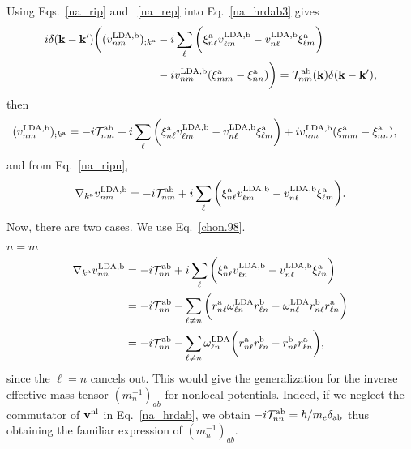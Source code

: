 Using Eqs.~\eqref{na_rip} and ~\eqref{na_rep}
into Eq.~\eqref{na_hrdab3} gives
\begin{align}\label{na_rapb}
i\delta(\mathbf{k}-\mathbf{k}')
\bigg(
(v^{\mathrm{LDA},\mathrm{b}}_{nm})_{;k^{\mathrm{a}}}
&
-i
\sum_{\ell}
\bigg(
\xi^{\mathrm{a}}_{n\ell}
v^{\mathrm{LDA},\mathrm{b}}_{\ell m}
-
v^{\mathrm{LDA},\mathrm{b}}_{n\ell}
\xi^{\mathrm{a}}_{\ell m}
\bigg)
\nonumber \\
&
-i
v^{\mathrm{LDA},\mathrm{b}}_{nm}(\xi^{\mathrm{a}}_{mm}
-
\xi^{\mathrm{a}}_{nn}
)
\bigg)
=
{\cal T}^{\mathrm{a}\mathrm{b}}_{nm}(\mathbf{k})\delta(\mathbf{k}-\mathbf{k}')
,
\end{align}
then
\begin{align}\label{na_rapb2}
(v^{\mathrm{LDA},\mathrm{b}}_{nm})_{;k^{\mathrm{a}}}&=
-i
{\cal T}^{\mathrm{a}\mathrm{b}}_{nm}
+i
\sum_{\ell}
\bigg(
\xi^{\mathrm{a}}_{n\ell}
v^{\mathrm{LDA},\mathrm{b}}_{\ell m}
-
v^{\mathrm{LDA},\mathrm{b}}_{n\ell}
\xi^{\mathrm{a}}_{\ell m}
\bigg)
+i
v^{\mathrm{LDA},\mathrm{b}}_{nm}(\xi^{\mathrm{a}}_{mm}
-
\xi^{\mathrm{a}}_{nn}
)
,
\end{align}
and from Eq.~\eqref{na_ripn},
\begin{align}\label{ncogno}
\nabla_{k^{\mathrm{a}}}v^{\mathrm{LDA},\mathrm{b}}_{nm}=
-i{\cal T}^{\mathrm{a}\mathrm{b}}_{nm}
+i
\sum_{\ell}
\bigg(
\xi^{\mathrm{a}}_{n\ell}
v^{\mathrm{LDA},\mathrm{b}}_{\ell m}
-
v^{\mathrm{LDA},\mathrm{b}}_{n\ell}
\xi^{\mathrm{a}}_{\ell m}
\bigg)
.
\end{align}
Now, there are two cases. We use Eq.~\eqref{chon.98}.

 $n=m$
\begin{align}\label{ntita}
\nabla_{k^{\mathrm{a}}}v^{\mathrm{LDA},\mathrm{b}}_{nn}&=
-i{\cal T}^{\mathrm{a}\mathrm{b}}_{nn}
+i
\sum_{\ell}
\bigg(
\xi^{\mathrm{a}}_{n\ell}
v^{\mathrm{LDA},\mathrm{b}}_{\ell n}
-
v^{\mathrm{LDA},\mathrm{b}}_{n\ell}
\xi^{\mathrm{a}}_{\ell n}
\bigg)
\nonumber\\
&=
-i{\cal T}^{\mathrm{a}\mathrm{b}}_{nn}
-
\sum_{\ell\ne n}
\bigg(
r^{\mathrm{a}}_{n\ell}
\omega^{\mathrm{LDA}}_{\ell n}
r^{\mathrm{b}}_{\ell n}
-
\omega^{\mathrm{LDA}}_{n\ell}
r^{\mathrm{b}}_{n\ell}
r^{\mathrm{a}}_{\ell n}
\bigg)
\nonumber\\
&=
-i{\cal T}^{\mathrm{a}\mathrm{b}}_{nn}
-
\sum_{\ell\ne n}
\omega^{\mathrm{LDA}}_{\ell n}
\bigg(
r^{\mathrm{a}}_{n\ell}
r^{\mathrm{b}}_{\ell n}
-
r^{\mathrm{b}}_{n\ell}
r^{\mathrm{a}}_{\ell n}
\bigg)
,
\end{align}
since the $\ell=n$ cancels out. 
This
would give the generalization for the inverse effective mass
tensor $(m_n^{-1})_{ab}$ for nonlocal potentials.
Indeed, if we neglect the commutator of $\mathbf{v}^{\mathrm{nl}}$ in
Eq.~\eqref{na_hrdab}, we obtain 
$-i{\cal T}^{\mathrm{a}\mathrm{b}}_{nn}=\hbar/m_e\delta_{\mathrm{a}\mathrm{b}}$
thus obtaining the  familiar expression of $(m_n^{-1})_{ab}$.\cite{ashcroft_solid_1976}

